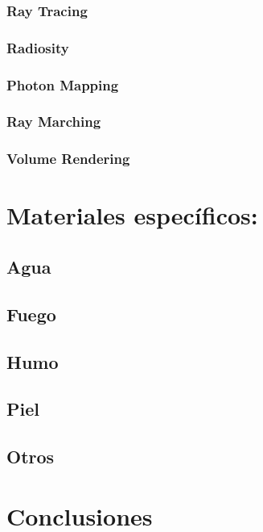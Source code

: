 \subsubsection{Ray Tracing}
\subsubsection{Radiosity}
\subsubsection{Photon Mapping}
\subsubsection{Ray Marching}
\subsubsection{Volume Rendering}

\section{Materiales específicos:}
\subsection{Agua}
\subsection{Fuego}
\subsection{Humo}
\subsection{Piel}
\subsection{Otros}


\section{Conclusiones}

